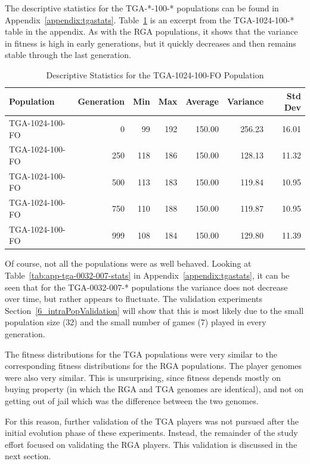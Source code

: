 The descriptive statistics for the TGA-*-100-* populations can be found in
Appendix~\ref{appendix:tgastats}. Table~\ref{tab:tga-1024-100-fo-stats} is an
excerpt from the TGA-1024-100-* table in the appendix. As with the RGA
populations, it shows that the variance in fitness is high in early generations,
but it quickly decreases and then remains stable through the last generation.

\begin{table}[htbp]
  \centering
  \caption[TGA-1024-100-FO Statistics]{Descriptive Statistics for the TGA-1024-100-FO Population}
    \begin{tabular}{lrrrrrr}
    \toprule
    Population &  Generation & Min    & Max    & Average & Variance & Std Dev \\
    \midrule
    TGA-1024-100-FO & 0      & 99     & 192    & 150.00 & 256.23 & 16.01 \\
    TGA-1024-100-FO & 250    & 118    & 186    & 150.00 & 128.13 & 11.32 \\
    TGA-1024-100-FO & 500    & 113    & 183    & 150.00 & 119.84 & 10.95 \\
    TGA-1024-100-FO & 750    & 110    & 188    & 150.00 & 119.87 & 10.95 \\
    TGA-1024-100-FO & 999    & 108    & 184    & 150.00 & 129.80 & 11.39 \\
    \bottomrule
    \end{tabular}
  \label{tab:tga-1024-100-fo-stats}%
\end{table}%

Of course, not all the populations were as well behaved. Looking at
Table~\ref{tab:app-tga-0032-007-stats} in Appendix~\ref{appendix:tgastats}, it
can be seen that for the TGA-0032-007-* populations the variance does not
decrease over time, but rather appears to fluctuate. The validation experiments
Section~\ref{6_intraPopValidation} will show that this is most likely due to the
small population size (32) and the small number of games (7) played in every
generation.

The fitness distributions for the TGA populations were very similar to the
corresponding fitness distributions for the RGA populations. The player genomes
were also very similar. This is unsurprising, since fitness depends mostly on
buying property (in which the RGA and TGA genomes are identical), and not on
getting out of jail which was the difference between the two genomes.

For this reason, further validation of the TGA players was not pursued after
the initial evolution phase of these experiments. Instead, the remainder of the
study effort focused on validating the RGA players. This validation is discussed
in the next section.

